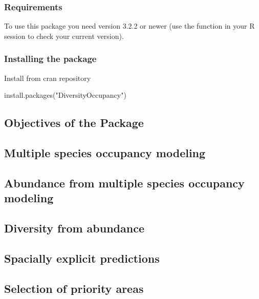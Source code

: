 \documentclass[article]{jss}
\begin{document}
\subsubsection{Requirements}\label{requirements}

To use this package you need  version 3.2.2 or newer (use
the function  in your R session to check your
current version).

\subsubsection{Installing the package}\label{installing-the-package}

Install from cran repository

\begin{CodeChunk}
\begin{CodeInput}
install.packages("DiversityOccupancy")
\end{CodeInput}
\end{CodeChunk}

\subsection{Objectives of the Package}\label{objectives-of-the-package}

\subsection{Multiple species occupancy
modeling}\label{multiple-species-occupancy-modeling}

\subsection{Abundance from multiple species occupancy
modeling}\label{abundance-from-multiple-species-occupancy-modeling}

\subsection{Diversity from abundance}\label{diversity-from-abundance}

\subsection{Spacially explicit
predictions}\label{spacially-explicit-predictions}

\subsection{Selection of priority
areas}\label{selection-of-priority-areas}
\end{document}
